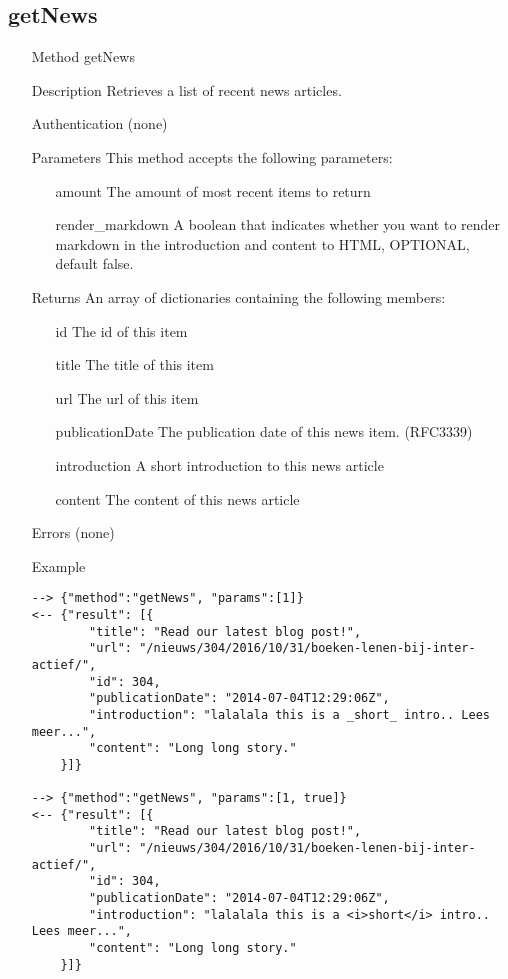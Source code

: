 \documentclass[a4paper]{scrreprt}
\begin{document}
\subsection{getNews}
\begin{enumerate}
\item[Method] getNews
\item[Description] Retrieves a list of recent news articles.
\item[Authentication] (none)
\item[Parameters] This method accepts the following parameters:
\begin{enumerate}
    \item[amount] The amount of most recent items to return
    \item[render\_markdown] A boolean that indicates whether you want to render markdown in the introduction and content to HTML, OPTIONAL, default false.
    \end{enumerate}
\item[Returns] An array of dictionaries containing the following members:
\begin{enumerate}
    \item[id] The id of this item
    \item[title] The title of this item
    \item[url] The url of this item
	\item[publicationDate] The publication date of this news item. (RFC3339)
    \item[introduction] A short introduction to this news article
    \item[content] The content of this news article
    \end{enumerate}
\item[Errors] (none)
\item[Example]
\begin{lstlisting}
--> {"method":"getNews", "params":[1]}
<-- {"result": [{
        "title": "Read our latest blog post!",
        "url": "/nieuws/304/2016/10/31/boeken-lenen-bij-inter-actief/",
        "id": 304,
        "publicationDate": "2014-07-04T12:29:06Z",
        "introduction": "lalalala this is a _short_ intro.. Lees meer...",
        "content": "Long long story."
    }]}

--> {"method":"getNews", "params":[1, true]}
<-- {"result": [{
        "title": "Read our latest blog post!",
        "url": "/nieuws/304/2016/10/31/boeken-lenen-bij-inter-actief/",
        "id": 304,
        "publicationDate": "2014-07-04T12:29:06Z",
        "introduction": "lalalala this is a <i>short</i> intro.. Lees meer...",
        "content": "Long long story."
    }]}
\end{lstlisting}
\end{enumerate}
\end{document}
